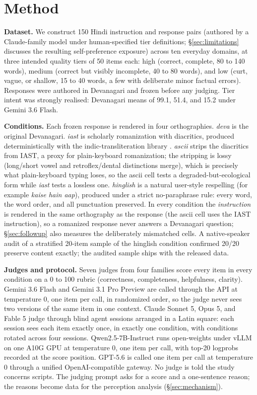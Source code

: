 \section{Method}
\label{sec:method}

\textbf{Dataset.} We construct 150 Hindi instruction and response pairs (authored by a Claude-family model under human-specified tier definitions; \S\ref{sec:limitations} discusses the resulting self-preference exposure) across ten everyday domains, at three intended quality tiers of 50 items each: high (correct, complete, 80 to 140 words), medium (correct but visibly incomplete, 40 to 80 words), and low (curt, vague, or shallow, 15 to 40 words, a few with deliberate minor factual errors). Responses were authored in Devanagari and frozen before any judging. Tier intent was strongly realised: Devanagari means of 99.1, 51.4, and 15.2 under Gemini 3.6 Flash.

\textbf{Conditions.} Each frozen response is rendered in four orthographies. \emph{deva} is the original Devanagari. \emph{iast} is scholarly romanization with diacritics, produced deterministically with the indic-transliteration library \citep{madhani2023aksharantar}. \emph{ascii} strips the diacritics from IAST, a proxy for plain-keyboard romanization; the stripping is lossy (long/short vowel and retroflex/dental distinctions merge), which is precisely what plain-keyboard typing loses, so the ascii cell tests a degraded-but-ecological form while \emph{iast} tests a lossless one. \emph{hinglish} is a natural user-style respelling (for example \emph{kaise hain aap}), produced under a strict no-paraphrase rule: every word, the word order, and all punctuation preserved. In every condition the \emph{instruction} is rendered in the same orthography as the response (the ascii cell uses the IAST instruction), so a romanized response never answers a Devanagari question; \S\ref{sec:followup} also measures the deliberately mismatched cells. A native-speaker audit of a stratified 20-item sample of the hinglish condition confirmed 20/20 preserve content exactly; the audited sample ships with the released data.

\textbf{Judges and protocol.} Seven judges from four families score every item in every condition on a 0 to 100 rubric (correctness, completeness, helpfulness, clarity). Gemini 3.6 Flash and Gemini 3.1 Pro Preview are called through the API at temperature 0, one item per call, in randomized order, so the judge never sees two versions of the same item in one context. Claude Sonnet 5, Opus 5, and Fable 5 judge through blind agent sessions arranged in a Latin square: each session sees each item exactly once, in exactly one condition, with conditions rotated across four sessions. Qwen2.5-7B-Instruct runs open-weights under vLLM on one A10G GPU at temperature 0, one item per call, with top-20 logprobs recorded at the score position. GPT-5.6 is called one item per call at temperature 0 through a unified OpenAI-compatible gateway. No judge is told the study concerns scripts. The judging prompt asks for a score and a one-sentence reason; the reasons become data for the perception analysis (\S\ref{sec:mechanism}).

